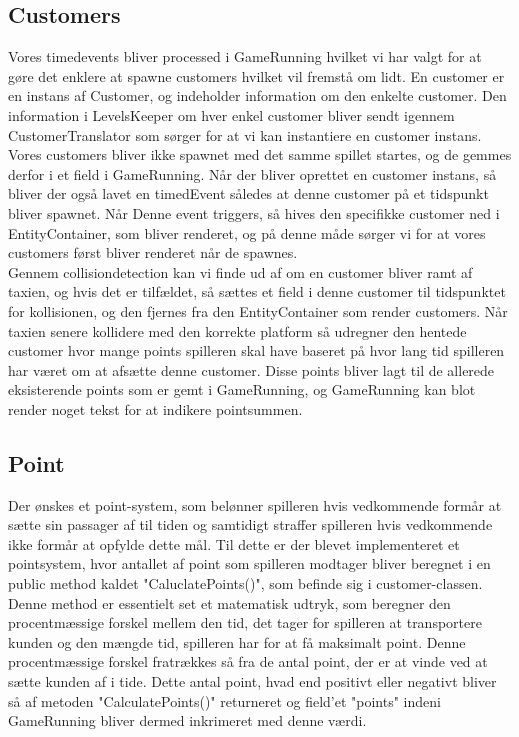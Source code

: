 \subsection{Customers}
   Vores timedevents bliver processed i GameRunning hvilket vi har valgt for at gøre det enklere at spawne customers hvilket vil fremstå om lidt. En customer er en instans af Customer, og indeholder information om den enkelte customer. Den information i LevelsKeeper om hver enkel customer bliver sendt igennem CustomerTranslator som sørger for at vi kan instantiere en customer instans. Vores customers bliver ikke spawnet med det samme spillet startes, og de gemmes derfor i et field i GameRunning. Når der bliver oprettet en customer instans, så bliver der også lavet en timedEvent således at denne customer på et tidspunkt bliver spawnet. Når Denne event triggers, så hives den specifikke customer ned i EntityContainer, som bliver renderet, og på denne måde sørger vi for at vores customers først bliver renderet når de spawnes.\\
   Gennem collisiondetection kan vi finde ud af om en customer bliver ramt af taxien, og hvis det er tilfældet, så sættes et field i denne customer til tidspunktet for kollisionen, og den fjernes fra den EntityContainer som render customers. Når taxien senere kollidere med den korrekte platform så udregner den hentede customer hvor mange points spilleren skal have baseret på hvor lang tid spilleren har været om at afsætte denne customer. Disse points bliver lagt til de allerede eksisterende points som er gemt i GameRunning, og GameRunning kan blot render noget tekst for at indikere pointsummen.\\

   \subsection{Point}
   Der ønskes et point-system, som belønner spilleren hvis vedkommende formår at sætte sin passager af til tiden og samtidigt straffer spilleren hvis vedkommende ikke formår at opfylde dette mål.
   Til dette er der blevet implementeret et pointsystem, hvor antallet af point som spilleren modtager bliver beregnet i en public method kaldet "CaluclatePoints()", som befinde sig i customer-classen.
   Denne method er essentielt set et matematisk udtryk, som beregner den procentmæssige forskel mellem den tid, det tager for spilleren at transportere kunden og den mængde tid, spilleren har for at få maksimalt point. Denne procentmæssige forskel fratrækkes så fra de antal point, der er at vinde ved at sætte kunden af i tide.
   Dette antal point, hvad end positivt eller negativt bliver så af metoden "CalculatePoints()" returneret og field'et "points" indeni GameRunning bliver dermed inkrimeret med denne værdi.
   

